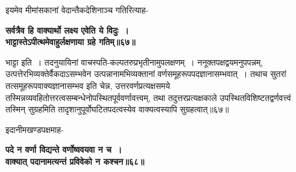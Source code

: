 {{{{ इयमेव मीमांसकानां वेदान्तैकदेशिनाञ्च गतिरित्याह-
\begin{center}{\bfseries सर्वत्रैव हि वाक्यार्थो लक्ष्य एवेति ये विदुः~।\\
 भाट्टास्तेऽपीत्थमेवाहुर्लक्षणाया ग्रहे गतिम्॥६७॥}\end{center}

 भाट्टा इति~।
 तदनुयायिनां वाचस्पति-कल्पतरुप्रभृतीनामुपलक्षणम्~।
ननूक्तपक्षद्वयमनुपपन्नम्, उत्पत्तेरभिव्यक्तेर्वैकदाऽसम्भवेन उत्पन्नानामभिव्यक्तानां वर्णसमूहरूपपदज्ञानासम्भवात्~।
तथाच सुतरां तत्समूहरूपवाक्यज्ञानासम्भव इति चेन्न, उत्तरवर्णप्रत्यक्षसमये तस्मिन्नव्यवहितोत्तरत्वसम्बन्धेनोपस्थितपूर्ववर्णावत्त्वम्, तथा तदुत्तरप्रत्यक्षकाले उपस्थितविशिष्टतद्वर्णवत्त्वं तस्मिन् सुग्रहमिति तादृशानुपूर्वोघटितपदत्वस्येव वाक्यत्वस्यापि सुग्रहत्वात्॥६७॥

इदानीमखण्डपक्षमाह-
\begin{center}{\bfseries पदे न वर्णा विद्यन्ते वर्णोष्ववयवा न च~।\\
 वाक्यात् पदानामत्यन्तं प्रविवेको न कश्चन॥६८॥}\end{center}

}}}}
